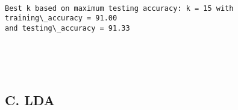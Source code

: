 \documentclass[11pt]{article}
\begin{document}
    \begin{center}
    \end{center}
    { \hspace*{\fill} \\}
    
    \begin{Verbatim}[commandchars=\\\{\}]
Best k based on maximum testing accuracy: k = 15 with training\_accuracy = 91.00
and testing\_accuracy = 91.33
    \end{Verbatim}

    \begin{center}
    \end{center}
    { \hspace*{\fill} \\}
    
    \begin{center}
    \end{center}
    { \hspace*{\fill} \\}
    
    \hypertarget{c.-lda}{%
\subsection{C. LDA}\label{c.-lda}}
\end{document}
